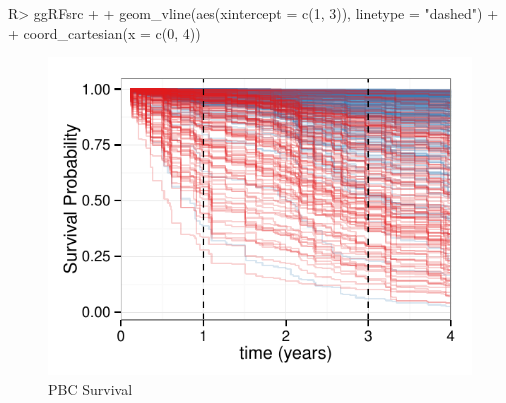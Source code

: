 \documentclass[nojss]{jss}\usepackage[]{graphicx}\usepackage[]{color}
\makeatletter
\def\maxwidth{ %
  \ifdim\Gin@nat@width>\linewidth
    \linewidth
  \else
    \Gin@nat@width
  \fi
}
\makeatother
\begin{document}
\begin{Schunk}
\begin{Sinput}
R> ggRFsrc + 
+  geom_vline(aes(xintercept = c(1, 3)), linetype = "dashed") + 
+  coord_cartesian(x = c(0, 4))
\end{Sinput}
\begin{figure}[!htpb]

{\centering \includegraphics[width=\maxwidth]{figure/rfs-rfsrc-plot3Mnth-1} 

}

\caption[PBC Survival]{PBC Survival\label{fig:rfsrc-plot3Mnth}}
\end{figure}
\end{Schunk}
\end{document}
